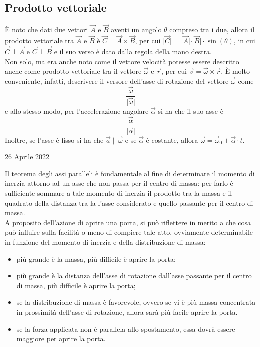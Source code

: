 \documentclass[a4paper]{extarticle}
\begin{document}
\vspace{1em}
\subsection{Prodotto vettoriale}
È noto che dati due vettori $\vec{A}$ e $\vec{B}$ aventi un angolo $\theta$ compreso tra i due, allora il prodotto vettoriale tra $\vec A$ e $\vec B$ è $\vec C = \vec A \times \vec B$, per cui $\vert \vec C \vert = \vert \vec A \vert \cdot \vert \vec B \vert \cdot \sin(\theta)$, in cui $\vec C \perp \vec A$ e $\vec C \perp \vec B$ e il suo verso è dato dalla regola della mano destra.\\
Non solo, ma era anche noto come il vettore velocità potesse essere descritto anche come prodotto vettoriale tra il vettore $\vec \omega$ e $\vec r$, per cui $\vec v = \vec \omega \times \vec r$. È molto conveniente, infatti, descrivere il versore dell'asse di rotazione del vettore $\vec \omega$ come
\[\frac{\vec \omega}{\vert \vec \omega \vert}\]
e allo stesso modo, per l'accelerazione angolare $\vec \alpha$ si ha che il suo asse è
\[\frac{\vec \alpha}{\vert \vec \alpha \vert}\]
Inoltre, se l'asse è fisso si ha che $\vec a \parallel \vec \omega$ e se $\vec \alpha$ è costante, allora $\vec \omega = \vec \omega_0 + \vec \alpha \cdot t$.

\newpage
\noindent
\begin{center}
  26 Aprile 2022
\end{center}
Il teorema degli assi paralleli è fondamentale al fine di determinare il momento di inerzia attorno ad un asse che non passa per il centro di massa: per farlo è sufficiente sommare a tale momento di inerzia il prodotto tra la massa e il quadrato della distanza tra la l'asse considerato e quello passante per il centro di massa.\\
A proposito dell'azione di aprire una porta, si può riflettere in merito a che cosa può influire sulla facilità o meno di compiere tale atto, ovviamente determinabile in funzione del momento di inerzia e della distribuzione di massa:
\begin{itemize}
  \item più grande è la massa, più difficile è aprire la porta;
  \item più grande è la distanza dell'asse di rotazione dall'asse passante per il centro di massa, più difficile è aprire la porta;
  \item se la distribuzione di massa è favorevole, ovvero se vi è più massa concentrata in prossimità dell'asse di rotazione, allora sarà più facile aprire la porta.
  \item se la forza applicata non è parallela allo spostamento, essa dovrà essere maggiore per aprire la porta.
\end{itemize}
\end{document}
